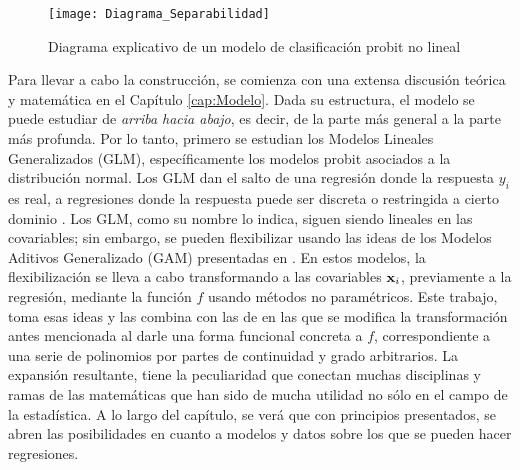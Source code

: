 \documentclass[../Main/Main.tex]{subfiles}
\begin{document}
\begin{figure}[h]
  \centering
      \texttt{[image: Diagrama\_Separabilidad]}
  \caption{Diagrama explicativo de un modelo de clasificación probit no lineal}
  \label{fig:DiagramaIntro}
\end{figure}

Para llevar a cabo la construcción, se comienza con una extensa discusión teórica y matemática en el Capítulo \ref{cap:Modelo}. Dada su estructura, el modelo se puede estudiar de \textit{arriba hacia abajo}, es decir, de la parte más general a la parte más profunda. Por lo tanto, primero se estudian los Modelos Lineales Generalizados (GLM), específicamente los modelos probit asociados a la distribución normal. Los GLM dan el salto de una regresión donde la respuesta $y_i$ es real, a regresiones donde la respuesta puede ser discreta o restringida a cierto dominio \autocite{maccullagh1989generalized}. Los GLM, como su nombre lo indica, siguen siendo lineales en las covariables; sin embargo, se pueden flexibilizar usando las ideas de los Modelos Aditivos Generalizado (GAM) presentadas en \citet{hastie1986generalized}. En estos modelos, la flexibilización se lleva a cabo transformando a las covariables $\mathbf{x}_i$, previamente a la regresión, mediante la función $f$ usando métodos no paramétricos. Este trabajo, toma esas ideas y las combina con las de \citet{mallik1998automatic} en las que se modifica la transformación antes mencionada al darle una forma funcional concreta a $f$, correspondiente a una serie de polinomios por partes de continuidad y grado arbitrarios. La expansión resultante, tiene la peculiaridad que conectan muchas disciplinas y ramas de las matemáticas que han sido de mucha utilidad no sólo en el campo de la estadística. A lo largo del capítulo, se verá que con principios presentados, se abren las posibilidades en cuanto a modelos y datos sobre los que se pueden hacer regresiones. 
\end{document}
